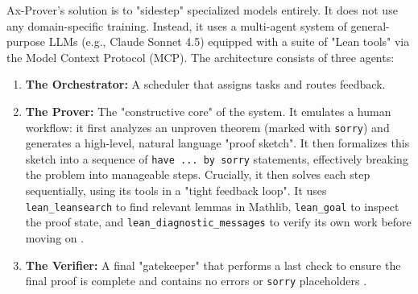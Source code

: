 \documentclass[12pt, letterpaper]{article}
\begin{document}
Ax-Prover's solution is to "sidestep" specialized models entirely. It does not use any domain-specific training. Instead, it uses a multi-agent system of general-purpose LLMs (e.g., Claude Sonnet 4.5) equipped with a suite of "Lean tools" via the Model Context Protocol (MCP). The architecture consists of three agents:
\begin{enumerate}
    \item \textbf{The Orchestrator:} A scheduler that assigns tasks and routes feedback.\citep{breen2025axproverdeepreasoningagentic}
    \item \textbf{The Prover:} The "constructive core" of the system. It emulates a human workflow: it first analyzes an unproven theorem (marked with \texttt{sorry}) and generates a high-level, natural language "proof sketch". It then formalizes this sketch into a sequence of \texttt{have ... by sorry} statements, effectively breaking the problem into manageable steps. Crucially, it then solves each step sequentially, using its tools in a "tight feedback loop". It uses \texttt{lean\_leansearch} to find relevant lemmas in Mathlib, \texttt{lean\_goal} to inspect the proof state, and \texttt{lean\_diagnostic\_messages} to verify its own work before moving on \citep{breen2025axproverdeepreasoningagentic}.
    \item \textbf{The Verifier:} A final "gatekeeper" that performs a last check to ensure the final proof is complete and contains no errors or \texttt{sorry} placeholders \citep{breen2025axproverdeepreasoningagentic}.
\end{enumerate}
\end{document}
